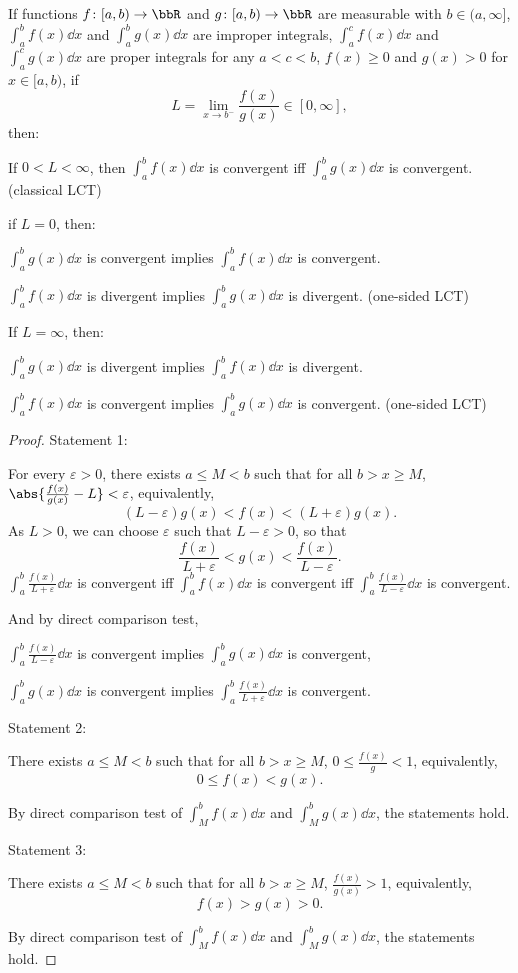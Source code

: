 If functions $f\colon [a,b)\to\bbR$ and $g\colon [a,b)\to\bbR$ are measurable with $b\in(a,\infty]$, $\int_a^bf(x)\dd{x}$ and $\int_a^bg(x)\dd{x}$ are improper integrals, $\int_a^cf(x)\dd{x}$ and $\int_a^cg(x)\dd{x}$ are proper integrals for any $a<c<b$, $f(x)\geq 0$ and $g(x)>0$ for $x\in[a,b)$, if
\[L=\lim_{x\to b^-}\frac{f(x)}{g(x)}\in[0,\infty],\]
then:
\ben
\item If $0<L<\infty$, then $\int_a^bf(x)\dd{x}$ is convergent iff $\int_a^bg(x)\dd{x}$ is convergent. (classical LCT)
\item if $L=0$, then:
\ben
\item $\int_a^bg(x)\dd{x}$ is convergent implies $\int_a^bf(x)\dd{x}$ is convergent.
\item $\int_a^bf(x)\dd{x}$ is divergent implies $\int_a^bg(x)\dd{x}$ is divergent.
\een
(one-sided LCT)
\item If $L=\infty$, then:
\ben
\item $\int_a^bg(x)\dd{x}$ is divergent implies $\int_a^bf(x)\dd{x}$ is divergent.
\item $\int_a^bf(x)\dd{x}$ is convergent implies $\int_a^bg(x)\dd{x}$ is convergent.
\een
(one-sided LCT)
\een
\begin{proof}
Statement 1:

For every $\varepsilon>0$, there exists $a\leq M<b$ such that for all $b>x\geq M$, $\abs{\frac{f(x)}{g(x)}-L}<\varepsilon$, equivalently,
\[(L-\varepsilon)g(x)<f(x)<(L+\varepsilon)g(x).\]
As $L>0$, we can choose $\varepsilon$ such that $L-\varepsilon>0$, so that
\[\frac{f(x)}{L+\varepsilon}<g(x)<\frac{f(x)}{L-\varepsilon}.\]
$\int_a^b\frac{f(x)}{L+\varepsilon}\dd{x}$ is convergent iff $\int_a^bf(x)\dd{x}$ is convergent iff $\int_a^b\frac{f(x)}{L-\varepsilon}\dd{x}$ is convergent.

And by direct comparison test,
\bit
\item $\int_a^b\frac{f(x)}{L-\varepsilon}\dd{x}$ is convergent implies $\int_a^bg(x)\dd{x}$ is convergent,
\item $\int_a^bg(x)\dd{x}$ is convergent implies $\int_a^b\frac{f(x)}{L+\varepsilon}\dd{x}$ is convergent.
\eit

Statement 2:

There exists $a\leq M<b$ such that for all $b>x\geq M$, $0\leq\frac{f(x)}{g}<1$, equivalently,
\[0\leq f(x)<g(x).\]

By direct comparison test of $\int_M^bf(x)\dd{x}$ and $\int_M^bg(x)\dd{x}$, the statements hold.

Statement 3:

There exists $a\leq M<b$ such that for all $b>x\geq M$, $\frac{f(x)}{g(x)}>1$, equivalently,
\[f(x)>g(x)>0.\]

By direct comparison test of $\int_M^bf(x)\dd{x}$ and $\int_M^bg(x)\dd{x}$, the statements hold.
\end{proof}
